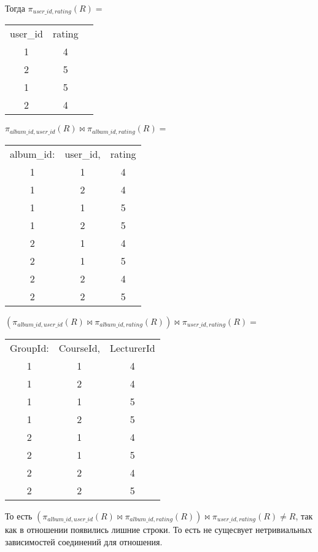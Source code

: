 \documentclass{article}
\begin{document}
	Тогда $\pi_{user\_id, rating}(R) = $
	
	\begin{center}
		\begin{tabular}{ccc}
			user\_id & rating \\
			1 & 4\\
			2 & 5 \\
			1 & 5\\
			2 & 4\\
		\end{tabular}
	\end{center}


		$\pi_{album\_id, user\_id}(R) \bowtie \pi_{album\_id, rating}(R) =$
		
		\begin{center}
			\begin{tabular}{ccc}
				album\_id: & user\_id,& rating \\
				1 & 1 & 4\\
				1 & 2& 4 \\
				1 & 1 & 5\\
				1 & 2 & 5\\
				2 & 1 & 4\\
				2 & 1 & 5\\
				2 & 2 & 4\\
				2 & 2 & 5\\
			\end{tabular}
		\end{center}
	
	$(\pi_{album\_id, user\_id}(R) \bowtie \pi_{album\_id, rating}(R)) \bowtie  \pi_{user\_id, rating}(R) = $
	
	\begin{center}
		\begin{tabular}{ccc}
			GroupId: & CourseId,& LecturerId \\
			1 & 1 & 4\\
			1 & 2& 4 \\
			1 & 1 & 5\\
			1 & 2 & 5\\
			2 & 1 & 4\\
			2 & 1 & 5\\
			2 & 2 & 4\\
			2 & 2 & 5\\
		\end{tabular}
	\end{center}
	
	
	То есть $(\pi_{album\_id, user\_id}(R) \bowtie \pi_{album\_id, rating}(R)) \bowtie  \pi_{user\_id, rating}(R) \neq R$, так как в отношении появились лишние строки. То есть не сущесвует нетривиальных зависимостей соединений для отношения.
	
\end{document}
